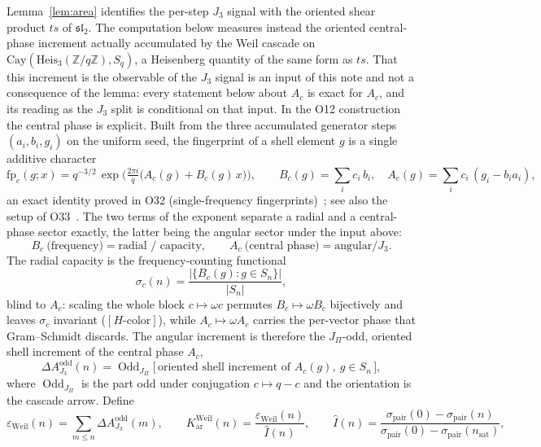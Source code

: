 \documentclass[11pt]{article}
\providecommand{\Heis}{\mathrm{Heis}}
\providecommand{\Ihat}{\widehat{I}}
\begin{document}
    Lemma~\ref{lem:area} identifies the per-step $J_3$ signal with the oriented shear product $ts$ of
    $\mathfrak{sl}_2$.
    The computation below measures instead the oriented central-phase increment actually accumulated by the Weil
    cascade on $\mathrm{Cay}(\Heis_3(\mathbb{Z}/q\mathbb{Z}), S_q)$, a Heisenberg quantity of the same form as $ts$.
    That this increment is the observable of the $J_3$ signal is an input of this note and not a consequence of
    the lemma: every statement below about $A_c$ is exact for $A_c$, and its reading as the $J_3$ split is
    conditional on that input.
    In the O12 construction the central phase is explicit.
    Built from the three accumulated generator steps $(a_i, b_i, g_i)$ on the uniform seed, the fingerprint
    of a shell element $g$ is a single additive character
    \[
      \mathrm{fp}_c(g; x) = q^{-3/2}\, \exp\!\Big( \tfrac{2\pi i}{q}\big( A_c(g) + B_c(g)\, x \big) \Big),
      \qquad
      B_c(g) = \sum_i c_i\, b_i, \quad
      A_c(g) = \sum_i c_i\, (g_i - b_i a_i),
    \]
    an exact identity proved in O32 (single-frequency fingerprints)~\cite{Beau2026a36}; see also the
    setup of O33~\cite{Beau2026a37}.
    The two terms of the exponent separate a radial and a central-phase sector exactly, the latter being the
    angular sector under the input above:
    \[
      B_c \ \text{(frequency)} = \text{radial / capacity},
      \qquad
      A_c \ \text{(central phase)} = \text{angular} / J_3 .
    \]
    The radial capacity is the frequency-counting functional
    \[
      \sigma_c(n) = \frac{|\{ B_c(g) : g \in S_n \}|}{|S_n|},
    \]
    blind to $A_c$: scaling the whole block $c \mapsto \omega c$ permutes $B_c \mapsto \omega B_c$
    bijectively and leaves $\sigma_c$ invariant ($[H\text{-color}]$), while $A_c \mapsto \omega A_c$ carries
    the per-vector phase that Gram--Schmidt discards.
    The angular increment is therefore the $J_\Pi$-odd, oriented shell increment of the central phase
    $A_c$,
    \[
      \Delta A_{J_3}^{\mathrm{odd}}(n)
      = \operatorname{Odd}_{J_\Pi}\big[\, \text{oriented shell increment of } A_c(g),\ g \in S_n \,\big],
    \]
    where $\operatorname{Odd}_{J_\Pi}$ is the part odd under conjugation $c \mapsto q-c$ and the orientation
    is the cascade arrow.
    Define
    \[
      \varepsilon_{\mathrm{Weil}}(n) = \sum_{m \le n} \Delta A_{J_3}^{\mathrm{odd}}(m),
      \qquad
      K_{\mathrm{ar}}^{\mathrm{Weil}}(n) = \frac{\varepsilon_{\mathrm{Weil}}(n)}{\Ihat(n)},
      \qquad
      \Ihat(n) = \frac{\sigma_{\mathrm{pair}}(0) - \sigma_{\mathrm{pair}}(n)}
      {\sigma_{\mathrm{pair}}(0) - \sigma_{\mathrm{pair}}(n_{\mathrm{sat}})} ,
    \]
\end{document}
